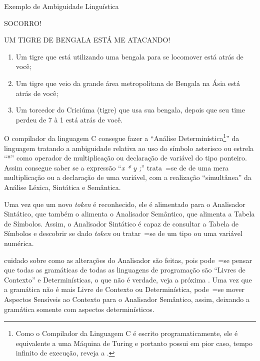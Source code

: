 \begin{quadro}[!htb]
\caption{Exemplo de Ambiguidade Linguística}
\label{exemploDeAmbiguidadeLinguistica}
\begin{bluebox}
    SOCORRO!

    UM TIGRE DE BENGALA ESTÁ ME ATACANDO!

    \begin{enumerate}%
        \item Um tigre que está utilizando uma bengala para se locomover está atrás de você;
        \item Um tigre que veio da grande área metropolitana de Bengala na Ásia está atrás de você;
        \item Um torcedor do Criciúma (tigre) que usa sua bengala,
        depois que seu time perdeu de 7 à 1 está atrás de você.
    \end{enumerate}
\end{bluebox}
\end{quadro}

O compilador da linguagem C consegue fazer a ``Análise Determinística\footnote{
Como o Compilador da Linguagem C é escrito programaticamente,
ele é equivalente a uma Máquina de Turing e
portanto possui em pior caso,
tempo infinito de execução,
reveja a .
}'' da linguagem tratando a ambiguidade relativa ao uso do símbolo asterisco ou
estrela ``*'' como operador de multiplicação ou
declaração de variável do tipo ponteiro.
Assim consegue saber se a expressão ``\textit{x * y ;}'' trata~=se de de uma mera multiplicação ou
a declaração de uma variável,
com a realização ``simultânea'' da Análise Léxica,
Sintática e
Semântica.

Uma vez que um novo \textit{token} é reconhecido,
ele é alimentado para o Analisador Sintático,
que também o alimenta o Analisador Semântico,
que alimenta a Tabela de Símbolos.
Assim,
o Analisador Sintático é capaz de consultar a Tabela de Símbolos \cite{ahoCompilerDragonBook} e
descobrir se dado \textit{token} ou
tratar~=se de um tipo ou
uma variável numérica.

 cuidado sobre como as alterações do Analisador são feitas,
pois pode~=se pensar que todas as gramáticas de todas as linguagens de programação são ``Livres de Contexto'' e
Determinísticas,
o que não é verdade,
veja a próxima .
Uma vez que a gramática não é mais Livre de Contexto ou
Determinística,
pode~=se mover Aspectos Sensíveis ao Contexto para o Analisador Semântico,
assim,
deixando a gramática somente com aspectos determinísticos.


